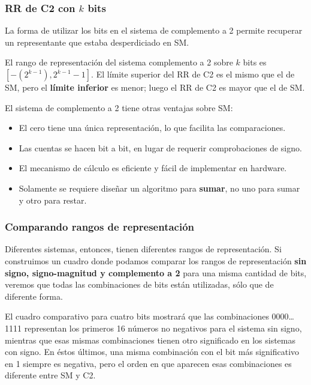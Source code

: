 \documentclass[spanish,A4,]{article}
\begin{document}
\subsubsection{RR de C2 con $k$ bits}\label{rr-de-c2-con-k-bits}

La forma de utilizar los bits en el sistema de complemento a 2 permite
recuperar un representante que estaba desperdiciado en SM.

El rango de representación del sistema complemento a 2 sobre $k$ bits es
$[-(2^{k-1}), 2^{k-1}-1]$. El límite superior del RR de C2 es el mismo
que el de SM, pero el \textbf{límite inferior} es menor; luego el RR de
C2 es mayor que el de SM.

El sistema de complemento a 2 tiene otras ventajas sobre SM:

\begin{itemize}
\itemsep1pt\parskip0pt
\item
  El cero tiene una única representación, lo que facilita las
  comparaciones.
\item
  Las cuentas se hacen bit a bit, en lugar de requerir comprobaciones de
  signo.
\item
  El mecanismo de cálculo es eficiente y fácil de implementar en
  hardware.
\item
  Solamente se requiere diseñar un algoritmo para \textbf{sumar}, no uno
  para sumar y otro para restar.
\end{itemize}

\subsubsection{Comparando rangos de
representación}\label{comparando-rangos-de-representaciuxf3n}

Diferentes sistemas, entonces, tienen diferentes rangos de
representación. Si construimos un cuadro donde podamos comparar los
rangos de representación \textbf{sin signo, signo-magnitud y complemento
a 2} para una misma cantidad de bits, veremos que todas las
combinaciones de bits están utilizadas, sólo que de diferente forma.

El cuadro comparativo para cuatro bits mostrará que las combinaciones
0000\ldots{}1111 representan los primeros 16 números no negativos para
el sistema sin signo, mientras que esas mismas combinaciones tienen otro
significado en los sistemas con signo. En éstos últimos, una misma
combinación con el bit más significativo en 1 siempre es negativa, pero
el orden en que aparecen esas combinaciones es diferente entre SM y C2.
\end{document}
